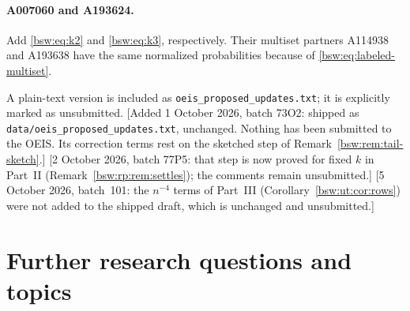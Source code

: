 \documentclass[11pt,letterpaper]{article}
\theoremstyle{definition}
\theoremstyle{remark}
\begin{document}
\paragraph{A007060 and A193624.}
Add \eqref{bsw:eq:k2} and \eqref{bsw:eq:k3}, respectively.  Their multiset partners
A114938 and A193638 have the same normalized probabilities because of
\eqref{bsw:eq:labeled-multiset}.

A plain-text version is included as \texttt{oeis\_proposed\_updates.txt}; it
is explicitly marked as unsubmitted.
[Added 1 October 2026, batch 73O2: shipped as
\texttt{data/oeis\_proposed\_updates.txt}, unchanged.  Nothing has been
submitted to the OEIS.  Its correction terms rest on the sketched step of
Remark~\ref{bsw:rem:tail-sketch}.]
[2 October 2026, batch 77P5: that step is now proved for fixed $k$ in
Part~II (Remark~\ref{bsw:rp:rem:settles}); the comments remain
unsubmitted.]
[5 October 2026, batch~101: the $n^{-4}$ terms of Part~III
(Corollary~\ref{bsw:ut:cor:rows}) were not added to the shipped draft,
which is unchanged and unsubmitted.]

\section{Further research questions and topics}
\label{bsw:sec:questions}
\end{document}
